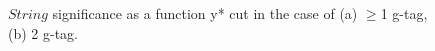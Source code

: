 \begin{figure}[htbp]
        \centering
        \caption{$String$ significance as a function y* cut in the case of (a) $\geq$1 g-tag, (b) 2 g-tag.}
        \label{fig: string significance as a function of y* cut}
\end{figure}
